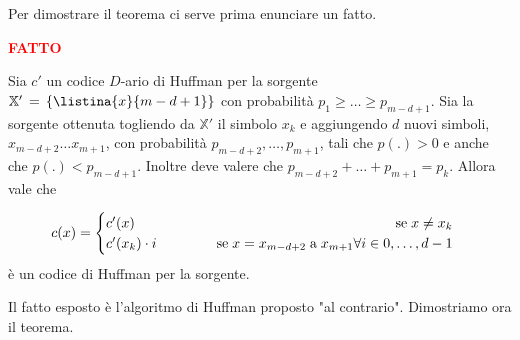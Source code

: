 \documentclass[12pt]{report}
\begin{document}
    \noindent
    Per dimostrare il teorema ci serve prima enunciare un fatto.

    \vspace{5px}
    \begin{tcolorbox}
        \textbf{\textcolor{red}{FATTO} }
        \vspace{5px}
        \begin{center}
            Sia $c'$ un codice $D$-ario di Huffman per la sorgente $\mathbb{X}' \,=\, \{\listina{x}{m-d+1}\}$ con probabilità $p_1 \geq \dots \geq p_{m-d+1}$. Sia \sorgente la sorgente ottenuta togliendo da $\mathbb{X}'$ il simbolo $x_k$ e aggiungendo $d$ nuovi simboli, $x_{m-d+2} \dots x_{m+1}$, con probabilità $p_{m-d+2},\dots,p_{m+1}$, tali che $p(.) > 0$ e anche che $p(.) < p_{m-d+1}$. Inoltre deve valere che $p_{m-d+2} + \dots + p_{m+1} = p_k$.
            Allora vale che

            $$ c(x) = \begin{cases}
                          c'(x)\hfill \;\text{se}\;x\neq x_k \\
                          c'(x_k) \cdot i \hspace{40px} \; \text{se} \; x = x_{m-d+2} \; \text{a} \; x_{m+1} \forall i \in 0,\dots,d-1
            \end{cases}$$
            è un codice di Huffman per la sorgente.
        \end{center}
    \end{tcolorbox}

    \noindent
    Il fatto esposto è l'algoritmo di Huffman proposto "al contrario".
    Dimostriamo ora il teorema.
\end{document}
